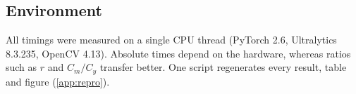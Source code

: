 \subsection{Environment}\label{sec:environment}
All timings were measured on a single CPU thread (PyTorch 2.6, Ultralytics 8.3.235, OpenCV 4.13). Absolute times depend on the hardware, whereas ratios such as $r$ and $C_m/C_y$ transfer better. One script regenerates every result, table and figure (\cref{app:repro}).
